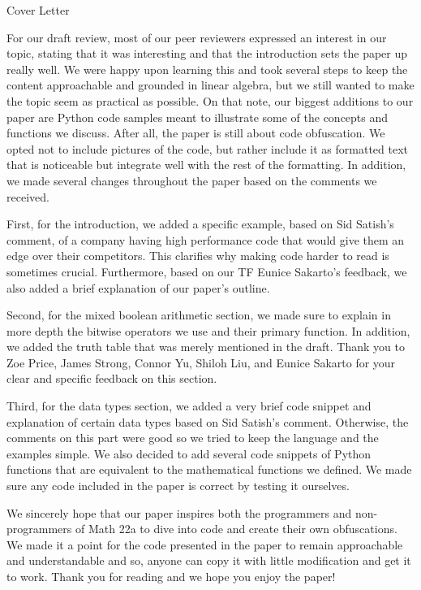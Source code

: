 \begin{center}
    {\huge Cover Letter}
\end{center}
\hspace{\parindent} For our draft review, most of our peer reviewers expressed
an
interest in our
topic, stating that it was interesting and that the introduction sets the paper
up really well. We were happy upon learning this and took several steps to keep
the content approachable and grounded in linear algebra, but we still wanted to
make the topic seem as practical as possible. On that note, our biggest
additions to our paper are Python code samples meant to illustrate some of the
concepts and functions we discuss. After all, the paper is still about code
obfuscation. We opted not to include pictures of the code, but rather include
it as formatted text that is noticeable but integrate well with the rest of the
formatting. In addition, we made several changes throughout the paper based on
the comments we received.

First, for the introduction, we added a specific example, based on Sid Satish's
comment, of a company having high performance code that would give them an edge
over their competitors. This clarifies why making code harder to read is
sometimes crucial. Furthermore, based on our TF Eunice Sakarto's feedback, we
also added a brief explanation of our paper's outline.

Second, for the mixed boolean arithmetic section, we made sure to explain in
more depth the bitwise operators we use and their primary function. In
addition, we added the truth table that was merely mentioned in the draft.
Thank you to Zoe Price, James Strong, Connor Yu, Shiloh Liu, and Eunice Sakarto
for your clear and specific feedback on this section.

Third, for the data types section, we added a very brief code snippet and
explanation of certain data types based on Sid Satish's comment. Otherwise,
the comments on this part were good so we tried to keep the language and the
examples simple. We also decided to add several code snippets of Python
functions that are equivalent to the mathematical functions we defined. We made
sure any code included in the paper is correct by testing it ourselves.

We sincerely hope that our paper inspires both the programmers and
non-programmers of Math 22a to dive into code and create their own
obfuscations. We made it a point for the code presented in the paper to remain
approachable and understandable and so, anyone can copy it with little
modification and get it to work. Thank you for reading and we hope you
enjoy the paper!
\newpage